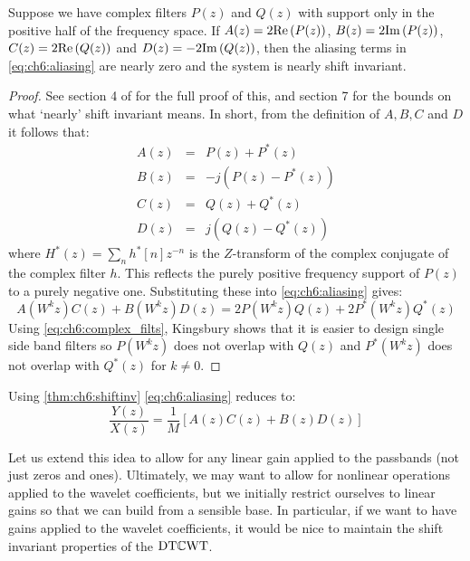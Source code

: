 \begin{theorem} \label{thm:ch6:shiftinv}
  Suppose we have complex filters $P(z)$ and $Q(z)$ with support only in the
  positive half of the frequency space. If $A(z) = 2\mathrm{Re}\left(P(z)\right)$, $B(z) =
  2\mathrm{Im}\left(P(z)\right)$, $C(z) = 2\mathrm{Re}\left(Q(z)\right)$ and $D(z) = -2\mathrm{Im}\left(Q(z)\right)$, then the aliasing
  terms in \eqref{eq:ch6:aliasing} are nearly zero and the system is nearly
  shift invariant.
\end{theorem}

\begin{proof}
  See section 4 of \cite{kingsbury_complex_2001} for the full proof of
  this, and section 7 for the bounds on what `nearly' shift invariant means. 
  In short, from the definition of $A, B, C$ and $D$ it follows that:  
  \begin{eqnarray*}
    A(z) &=& P(z) + P^*(z) \\
    B(z) &=& -j(P(z) - P^*(z)) \\
    C(z) &=& Q(z) + Q^*(z) \\
    D(z) &=& j(Q(z) - Q^*(z))
  \end{eqnarray*}
  where $H^*(z) = \sum_n h^*[n]z^{-n}$ is the $Z$-transform of the complex
  conjugate of the complex filter $h$. This reflects the purely positive
  frequency support of $P(z)$ to a purely negative one. Substituting these into
  \eqref{eq:ch6:aliasing} gives:
  \begin{equation}
    A(W^k z)C(z) + B(W^k z)D(z) = 2P(W^kz)Q(z) + 2P^*(W^kz)Q^*(z)
    \label{eq:ch6:complex_filts}
  \end{equation}
 Using \eqref{eq:ch6:complex_filts}, Kingsbury shows that it is easier to design
 single side band filters so $P(W^kz)$ does not overlap with $Q(z)$ and
 $P^*(W^kz)$ does not overlap with $Q^*(z)$ for $k \neq 0$.
\end{proof}

Using \autoref{thm:ch6:shiftinv} \eqref{eq:ch6:aliasing} reduces to:
\begin{equation}
 \frac{Y(z)}{X(z)} = \frac{1}{M}\left[ A(z)C(z) + B(z)D(z) \right]
  \label{eq:ch6:aliasing_cancel}
\end{equation}

Let us extend this idea to allow for any linear gain applied to the passbands
(not just zeros and ones). Ultimately, we may want to allow for nonlinear
operations applied to the wavelet coefficients, but we initially restrict
ourselves to linear gains so that we can build from a sensible base. In
particular, if we want to have gains applied to the wavelet coefficients, it
would be nice to maintain the shift invariant properties of the $\mathrm{DT}\mathbb{C}\mathrm{WT}$.

